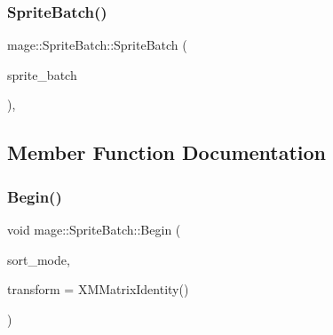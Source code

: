 \hypertarget{classmage_1_1_sprite_batch_a270604c9a535cc4fde6e5ff32b58618f}{}\label{classmage_1_1_sprite_batch_a270604c9a535cc4fde6e5ff32b58618f} 
\subsubsection{\texorpdfstring{Sprite\+Batch()}{SpriteBatch()}\hspace{0.1cm}{\footnotesize\ttfamily [3/3]}}
{\footnotesize\ttfamily mage\+::\+Sprite\+Batch\+::\+Sprite\+Batch (\begin{DoxyParamCaption}\item[{\hyperlink{classmage_1_1_sprite_batch}{Sprite\+Batch} \&\&}]{sprite\+\_\+batch }\end{DoxyParamCaption})\hspace{0.3cm}{\ttfamily [private]}, {\ttfamily [delete]}}



\subsection{Member Function Documentation}
\hypertarget{classmage_1_1_sprite_batch_ac7b901a07bdf23f624c9cf156a224c21}{}\label{classmage_1_1_sprite_batch_ac7b901a07bdf23f624c9cf156a224c21} 
\subsubsection{\texorpdfstring{Begin()}{Begin()}}
{\footnotesize\ttfamily void mage\+::\+Sprite\+Batch\+::\+Begin (\begin{DoxyParamCaption}\item[{\hyperlink{namespacemage_a256fa5833eecc408923de7ffadb5e014}{Sprite\+Sort\+Mode}}]{sort\+\_\+mode,  }\item[{X\+M\+M\+A\+T\+R\+IX}]{transform = {\ttfamily XMMatrixIdentity()} }\end{DoxyParamCaption})}

\hypertarget{classmage_1_1_sprite_batch_aa094c159600f6bca01c7f3aec96703ca}{}\label{classmage_1_1_sprite_batch_aa094c159600f6bca01c7f3aec96703ca} 
